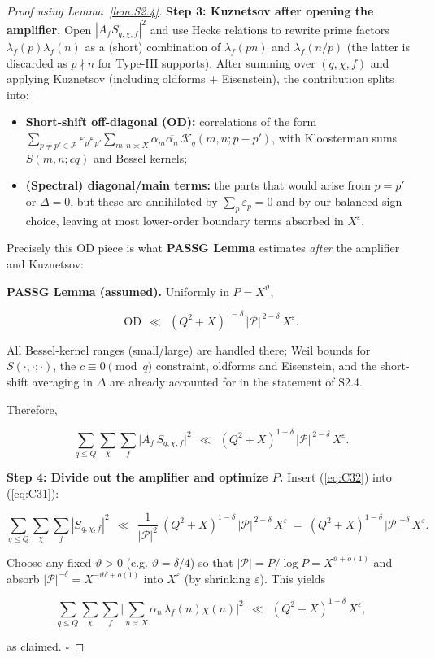 \documentclass[11pt]{article}
\def\eqref#1{(\ref{#1})}%
\theoremstyle{definition}
\theoremstyle{remark}
\numberwithin{equation}{part}
\begin{document}
\begin{proof}[Proof using Lemma~\ref{lem:S2.4}]
	\noindent\textbf{Step 3: Kuznetsov after opening the amplifier.}
	Open $|A_f S_{q,\chi,f}|^2$ and use Hecke relations to rewrite prime factors $\lambda_f(p)\lambda_f(n)$ as a (short) combination of $\lambda_f(pn)$ and $\lambda_f(n/p)$ (the latter is discarded as $p\nmid n$ for Type-III supports). After summing over $(q,\chi,f)$ and applying Kuznetsov (including oldforms + Eisenstein), the contribution splits into:

	\begin{itemize}
		\item \textbf{Short-shift off-diagonal (OD):} correlations of the form
		      $\sum_{p\neq p'\in\mathcal P}\varepsilon_p\varepsilon_{p'}\sum_{m,n\asymp X}\alpha_m\overline{\alpha_n}\, \mathcal{K}_{q}(m, n; p-p')$,
		      with Kloosterman sums $S(m,n;cq)$ and Bessel kernels;
		\item \textbf{(Spectral) diagonal/main terms:} the parts that would arise from $p=p'$ or $\Delta=0$, but these are annihilated by $\sum_p\varepsilon_p=0$ and by our balanced-sign choice, leaving at most lower-order boundary terms absorbed in $X^{\varepsilon}$.
	\end{itemize}

	Precisely this OD piece is what \textbf{PASSG Lemma} estimates \emph{after} the amplifier and Kuznetsov:

	\noindent\textbf{PASSG Lemma (assumed).} Uniformly in $P=X^\vartheta$,

	$$
		\mathrm{OD}\ \ \ll\ \ (Q^2+X)^{1-\delta}\,|\mathcal P|^{\,2-\delta}\,X^{\varepsilon}.
	$$

	All Bessel-kernel ranges (small/large) are handled there; Weil bounds for $S(\cdot,\cdot;\cdot)$, the $c\equiv0\pmod q$ constraint, oldforms and Eisenstein, and the short-shift averaging in $\Delta$ are already accounted for in the statement of S2.4.

	Therefore,

	\begin{equation}\label{eq:C32}
		\sum_{q\le Q}\sum_{\chi}\sum_f \big|A_f\,S_{q,\chi,f}\big|^2
		\ \ \ll\ \ (Q^2+X)^{1-\delta}\,|\mathcal P|^{\,2-\delta}\,X^{\varepsilon}.
	\end{equation}


	\noindent\textbf{Step 4: Divide out the amplifier and optimize $P$.}
	Insert \eqref{eq:C32} into \eqref{eq:C31}:

	$$
		\sum_{q\le Q}\sum_{\chi}\sum_f |S_{q,\chi,f}|^2
		\ \ \ll\ \ \frac{1}{|\mathcal P|^2}\ (Q^2+X)^{1-\delta}\,|\mathcal P|^{\,2-\delta}\,X^{\varepsilon}
		\ =\ (Q^2+X)^{1-\delta}\,|\mathcal P|^{-\delta}\,X^{\varepsilon}.
	$$

	Choose any fixed $\vartheta>0$ (e.g. $\vartheta=\delta/4$) so that $|\mathcal P|=P/\log P=X^{\vartheta+o(1)}$ and absorb $|\mathcal P|^{-\delta}=X^{-\vartheta\delta+o(1)}$ into $X^{\varepsilon}$ (by shrinking $\varepsilon$). This yields

	$$
		\sum_{q\le Q}\sum_{\chi}\sum_f \Big|\sum_{n\asymp X}\alpha_n\,\lambda_f(n)\chi(n)\Big|^2
		\ \ \ll\ \ (Q^2+X)^{1-\delta}\,X^{\varepsilon},
	$$

	as claimed. $\square$

\end{proof}
\end{document}
